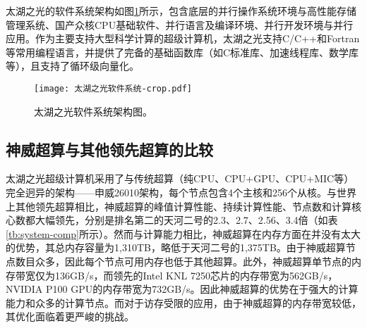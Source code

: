 太湖之光的软件系统架构如图\ref{fig:sunwaysofts}所示，包含底层的并行操作系统环境与高性能存储管理系统、国产众核CPU基础软件、并行语言及编译环境、并行开发环境与并行应用。作为主要支持大型科学计算的超级计算机，太湖之光支持C/C++和Fortran等常用编程语言，并提供了完备的基础函数库（如C标准库、加速线程库、数学库等），且支持了循环级向量化。

\begin{figure}[ht]
\centering
\texttt{[image: 太湖之光软件系统-crop.pdf]}
\caption{太湖之光软件系统架构图。}
\label{fig:sunwaysofts}
\end{figure}

\subsection{神威超算与其他领先超算的比较}

太湖之光超级计算机采用了与传统超算（纯CPU、CPU+GPU、CPU+MIC等）完全迥异的架构——申威26010架构，每个节点包含4个主核和256个从核。与世界上其他领先超算相比，神威超算的峰值计算性能、持续计算性能、节点数和计算核心数都大幅领先，分别是排名第二的天河二号的2.3、2.7、2.56、3.4倍（如表\ref{tb:system-comp}所示）。然而与计算能力相比，神威超算在内存方面在并没有太大的优势，其总内存容量为1,310TB，略低于天河二号的1,375TB。由于神威超算节点数目众多，因此每个节点可用内存也低于其他超算。此外，神威超算单节点的内存带宽仅为136GB/s，而领先的Intel KNL 7250芯片的内存带宽为562GB/s，NVIDIA P100 GPU的内存带宽为732GB/s。因此神威超算的优势在于强大的计算能力和众多的计算节点。而对于访存受限的应用，由于神威超算的内存带宽较低，其优化面临着更严峻的挑战。

\begin{table*}[ht]
\footnotesize
\caption{太湖之光超算系统与其他超算系统的比较。}
\label{tb:system-comp}
\end{table*}


